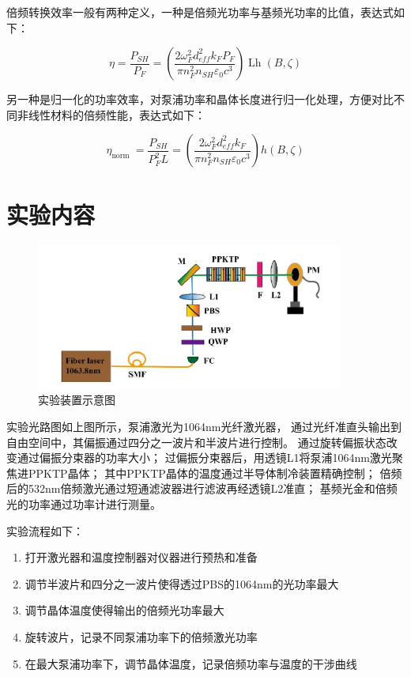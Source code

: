 \documentclass[a4paper,UTF8]{ctexart}
\begin{document}
倍频转换效率一般有两种定义，一种是倍频光功率与基频光功率的比值，表达式如下：

\begin{equation}
    \eta=\frac{P_{S H}}{P_F}=\left(\frac{2 \omega_F^2 d_{e f f}^2 k_F P_F}{\pi n_F^2 n_{S H} \varepsilon_0 c^3}\right) \operatorname{Lh}(B, \zeta)
\end{equation}


另一种是归一化的功率效率，对泵浦功率和晶体长度进行归一化处理，方便对比不同非线性材料的倍频性能，表达式如下：

\begin{equation}
   \eta_{\text {norm }}=\frac{P_{S H}}{P_F^2 L}=\left(\frac{2 \omega_F^2 d_{e f f}^2 k_F}{\pi n_F^2 n_{S H} \varepsilon_0 c^3}\right) h(B, \zeta) 
\end{equation}

\section{实验内容}

\begin{figure}[H]
    \centering
    \begin{minipage}[b]{0.9\textwidth}
        \centering
        \includegraphics[width=0.9\textwidth]{./fig1.jpg}
        \caption{实验装置示意图}
    \end{minipage}
\end{figure}

实验光路图如上图所示，泵浦激光为1064nm光纤激光器，
通过光纤准直头输出到自由空间中，其偏振通过四分之一波片和半波片进行控制。
通过旋转偏振状态改变通过偏振分束器的功率大小；
过偏振分束器后，用透镜L1将泵浦1064nm激光聚焦进PPKTP晶体；
其中PPKTP晶体的温度通过半导体制冷装置精确控制；
倍频后的532nm倍频激光通过短通滤波器进行滤波再经透镜L2准直；
基频光金和倍频光的功率通过功率计进行测量。

实验流程如下：

\begin{enumerate}
    \item 打开激光器和温度控制器对仪器进行预热和准备
    \item 调节半波片和四分之一波片使得透过PBS的1064nm的光功率最大
    \item 调节晶体温度使得输出的倍频光功率最大
    \item 旋转波片，记录不同泵浦功率下的倍频激光功率
    \item 在最大泵浦功率下，调节晶体温度，记录倍频功率与温度的干涉曲线
\end{enumerate}
\end{document}
